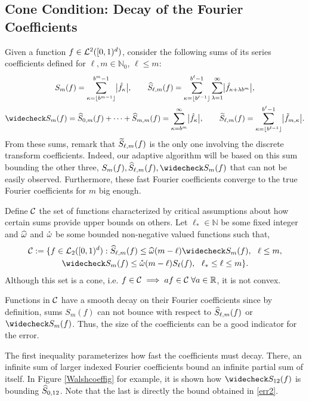 \documentclass[graybox,footinfo]{svmult}
\newcommand{\R}{\mathbb{R}} %
\newcommand{\N}{\mathbb{N}} %
\begin{document}
\subsection{Cone Condition: Decay of the Fourier Coefficients}\label{sumscoeff}
Given a function $f\in\mathcal{L}^2([0,1)^d)$, consider the following sums of its series coefficients defined for $\ell,m \in \N_0$, $\ell \le m$:
\begin{gather*}
S_m(f) =  \sum_{\kappa=\left \lfloor b^{m-1} \right \rfloor}^{b^{m}-1} \bigabs{\hf_{\kappa}}, \qquad 
\hS_{\ell,m}(f)  = \sum_{\kappa=\left \lfloor b^{\ell-1} \right \rfloor}^{b^{\ell}-1} \sum_{\lambda=1}^{\infty} \bigabs{ \hf_{\kappa+\lambda b^{m}}}, \\
\wcS_m(f)=\hS_{0,m}(f) + \cdots + \hS_{m,m}(f)=
\sum_{\kappa=b^{m}}^{\infty} \bigabs{\hf_{\kappa}}, \qquad
\tS_{\ell,m}(f) = \sum_{\kappa=\left \lfloor b^{\ell-1}\right \rfloor}^{b^{\ell}-1} \bigabs{\tf_{m,\kappa}}.
\end{gather*}
From these sums, remark that $\widetilde{S}_{\ell,m}(f)$ is the only one involving the discrete transform coefficients. Indeed, our adaptive algorithm will be based on this sum bounding the other three, $S_m(f),\hS_{\ell,m}(f),\wcS_m(f)$ that can not be easily observed. Furthermore, these fast Fourier coefficients converge to the true Fourier coefficients for $m$ big enough.

Define $\mathcal{C}$ the set of functions characterized by critical assumptions about how certain sums provide upper bounds on others.  Let $\ell_* \in \N$ be some fixed integer and $\widehat{\omega}$ and $\mathring{\omega}$ be some bounded non-negative valued functions such that,
\begin{multline} \label{conecond}
\cc:=\{f \in \cl_2(\cube) : \hS_{\ell,m}(f) \le \homega(m-\ell) \wcS_m(f),\ \ \ell \le m, \\
\wcS_m(f) \le \wcomega(m-\ell) S_{\ell}(f),\ \  \ell_* \le \ell \le m\}.
\end{multline}
Although this set is a cone, i.e. $f \in \cc \implies af \in \cc\;\forall a\in\R$, it is not convex.

Functions in $\mathcal{C}$ have a smooth decay on their Fourier coefficients since by definition, sums $S_m(f)$ can not bounce with respect to $\widehat{S}_{\ell,m}(f)$ or $\wcS_m(f)$. Thus, the size of the coefficients can be a good indicator for the error.

The first inequality parameterizes how fast the coefficients must decay. There, an infinite sum of larger indexed Fourier coefficients bound an infinite partial sum of itself. In Figure \ref{Walshcoeffig} for example, it is shown how $\wcS_{12}(f)$ is bounding $\widehat{S}_{0,12}$. Note that the last is directly the bound obtained in \eqref{err2}.
\end{document}
